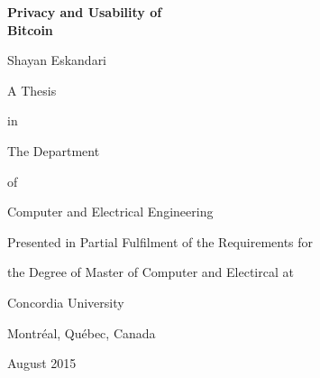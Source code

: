  \begin{titlepage}


     \vspace*{2ex}
     \begin{center}
       {\bf Privacy and Usability of}\\
       {\bf Bitcoin}
     \end{center}
     \vspace{10ex}
     \begin{center}
	Shayan Eskandari
     \end{center}
     \vspace{11ex}
     \begin{center}
        A Thesis
     \end{center}
     \vspace*{-3ex}
     \begin{center}
        in
     \end{center}
     \vspace*{-3ex}
     \begin{center}
        The Department
     \end{center}
     \vspace*{-3ex}
     \begin{center}
        of
     \end{center}
     \vspace*{-3ex}
     \begin{center}
       Computer and Electrical Engineering 
     \end{center}
     \vspace{14ex}
     \begin{center}
        Presented in Partial Fulfilment of the Requirements for
     \end{center}
     \vspace*{-3ex}
     \begin{center}
        the Degree of Master of Computer and Electircal at
     \end{center}
     \vspace*{-3ex}
     \begin{center}
        Concordia University
     \end{center}
     \vspace*{-3ex}
     \begin{center}
        Montr\'{e}al, Qu\'{e}bec, Canada
     \end{center}
     \vspace{10ex}
     \begin{center}
        August 2015
     \end{center}
  \end{titlepage}

